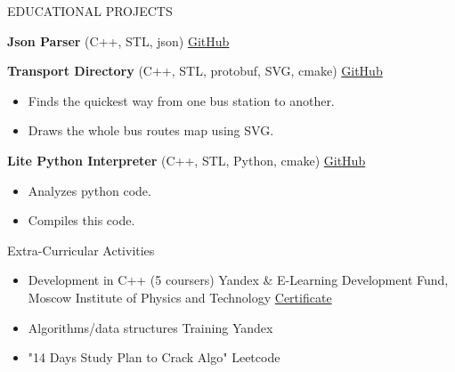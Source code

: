 \documentclass{resume} %
\begin{document}
\begin{rSection}{EDUCATIONAL PROJECTS}
\vspace{-1.25em}

\item \textbf{Json Parser} {(C++, STL, json)} \hfill
\href{https://github.com/Bfalse123/jsonparser}{GitHub}

\item \textbf{Transport Directory} {(C++, STL, protobuf, SVG, cmake)} \hfill \href{https://github.com/Bfalse123/TransportDirectory}{GitHub}
\begin{itemize}
    \itemsep -3pt {}
     \item Finds the quickest way from one bus station to another.
     \item Draws the whole bus routes map using SVG.
 \end{itemize}

 \item \textbf{Lite Python Interpreter} {(C++, STL, Python, cmake)} \hfill \href{https://github.com/Bfalse123/LitePythonInterpreter/}{GitHub}
\begin{itemize}
    \itemsep -3pt {}
     \item Analyzes python code.
     \item Compiles this code.
 \end{itemize}

\end{rSection}


\begin{rSection}{Extra-Curricular Activities}
\begin{itemize}
    \item Development in C++ (5 coursers) \hfill
    Yandex \& E-Learning Development Fund, Moscow Institute of Physics and Technology \hfill \href{https://drive.google.com/file/d/1d1d4hC7YXxu3HGqzQ9vJUY29GPHpFAra/view?usp=sharing}{Certificate}
    \item Algorithms/data structures Training \hfill Yandex
    \item "14 Days Study Plan to Crack Algo" \hfill Leetcode
\end{itemize}


\end{rSection}
\end{document}
